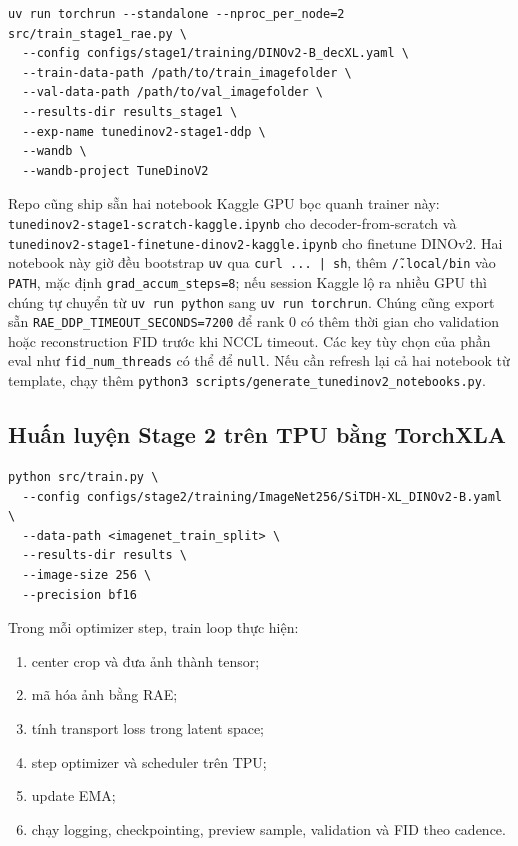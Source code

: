 \begin{lstlisting}[style=rae]
uv run torchrun --standalone --nproc_per_node=2 src/train_stage1_rae.py \
  --config configs/stage1/training/DINOv2-B_decXL.yaml \
  --train-data-path /path/to/train_imagefolder \
  --val-data-path /path/to/val_imagefolder \
  --results-dir results_stage1 \
  --exp-name tunedinov2-stage1-ddp \
  --wandb \
  --wandb-project TuneDinoV2
\end{lstlisting}

Repo cũng ship sẵn hai notebook Kaggle GPU bọc quanh trainer này:
\texttt{tunedinov2-stage1-scratch-kaggle.ipynb} cho decoder-from-scratch và
\texttt{tunedinov2-stage1-finetune-dinov2-kaggle.ipynb} cho finetune DINOv2.
Hai notebook này giờ đều bootstrap \texttt{uv} qua \texttt{curl ... | sh}, thêm
\texttt{\~/.local/bin} vào \texttt{PATH}, mặc định
\texttt{grad\_accum\_steps=8}; nếu session Kaggle lộ ra nhiều GPU thì chúng tự chuyển từ \texttt{uv run python} sang
\texttt{uv run torchrun}. Chúng cũng export sẵn
\texttt{RAE\_DDP\_TIMEOUT\_SECONDS=7200} để rank 0 có thêm thời gian cho
validation hoặc reconstruction FID trước khi NCCL timeout. Các key tùy chọn của phần eval như
\texttt{fid\_num\_threads} có thể để \texttt{null}. Nếu cần refresh lại cả hai notebook từ template, chạy thêm
\texttt{python3 scripts/generate\_tunedinov2\_notebooks.py}.

\subsection{Huấn luyện Stage 2 trên TPU bằng TorchXLA}

\begin{lstlisting}[style=rae]
python src/train.py \
  --config configs/stage2/training/ImageNet256/SiTDH-XL_DINOv2-B.yaml \
  --data-path <imagenet_train_split> \
  --results-dir results \
  --image-size 256 \
  --precision bf16
\end{lstlisting}

Trong mỗi optimizer step, train loop thực hiện:

\begin{enumerate}[leftmargin=1.8em]
  \item center crop và đưa ảnh thành tensor;
  \item mã hóa ảnh bằng RAE;
  \item tính transport loss trong latent space;
  \item step optimizer và scheduler trên TPU;
  \item update EMA;
  \item chạy logging, checkpointing, preview sample, validation và FID theo cadence.
\end{enumerate}

